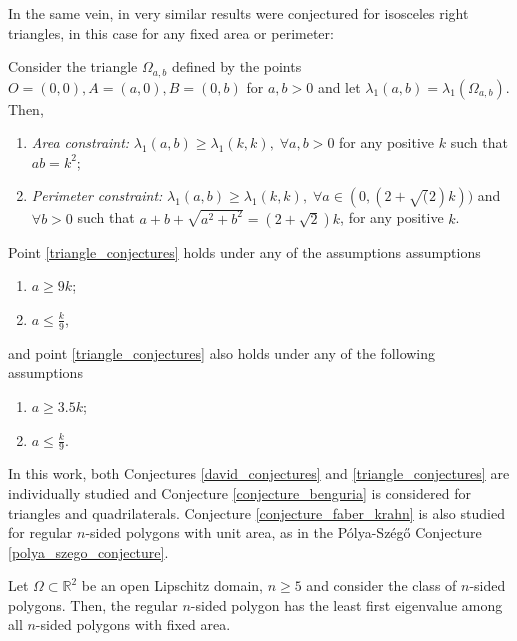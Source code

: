 In the same vein, in \cite{vu2023spectral} very similar results were conjectured for isosceles right triangles, in this case for any fixed area or perimeter:

\begin{conjecture}\label{triangle_conjectures}
    Consider the triangle \(\Omega_{a, b}\) defined by the points \(O=(0, 0), A=(a, 0), B=(0, b)\) for \(a, b>0\) and let \(\lambda_1(a, b) = \lambda_1(\Omega_{a, b})\). Then, 
    \begin{enumerate}
        \item \textit{Area constraint: } \(\lambda_1(a, b) \geq \lambda_1(k, k),\; \forall a, b>0\) for any positive \(k\) such that \(ab=k^2\);
        \item \textit{Perimeter constraint: } \(\lambda_1(a, b) \geq \lambda_1(k, k),\; \forall a \in (0, (2+\sqrt(2)k))\) and \(\forall b > 0\) such that \(a+b+\sqrt{a^2+b^2}=(2+\sqrt{2})k\), for any positive \(k\).
    \end{enumerate}
    Point \ref{triangle_conjectures} holds under any of the assumptions assumptions
    \begin{enumerate}
        \item \(a \geq 9k\);
        \item \(a \leq \frac{k}{9}\),
    \end{enumerate}
    and point \ref{triangle_conjectures} also holds under any of the following assumptions
    \begin{enumerate}
        \item \(a \geq 3.5k\);
        \item \(a \leq \frac{k}{9}\).
    \end{enumerate}
\end{conjecture}

In this work, both Conjectures \ref{david_conjectures} and \ref{triangle_conjectures} are individually studied and Conjecture \ref{conjecture_benguria} is considered for triangles and quadrilaterals. Conjecture \ref{conjecture_faber_krahn} is also studied for regular \(n\)-sided polygons with unit area, as in the Pólya-Szég\H{o} Conjecture \ref{polya_szego_conjecture}.

\begin{conjecture}\label{polya_szego_conjecture_dirac}
    Let \(\Omega \subset \mathbb{R}^2\) be an open Lipschitz domain, \(n \geq 5\) and consider the class of \(n\)-sided polygons. Then, the regular \(n\)-sided polygon has the least first eigenvalue among all \(n\)-sided polygons with fixed area.
\end{conjecture}

